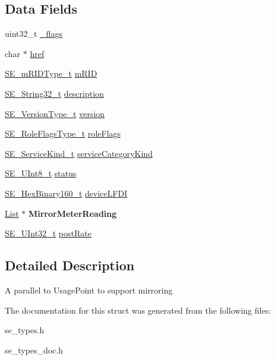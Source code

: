 \subsection*{Data Fields}
\begin{DoxyCompactItemize}
\item 
uint32\+\_\+t \hyperlink{group__MirrorUsagePoint_gae7ccaba110d336f5865327821a929458}{\+\_\+flags}
\item 
char $\ast$ \hyperlink{group__MirrorUsagePoint_ga7e3949f465787de6dcb910e837c1e277}{href}
\item 
\hyperlink{group__mRIDType_gac74622112f3a388a2851b2289963ba5e}{S\+E\+\_\+m\+R\+I\+D\+Type\+\_\+t} \hyperlink{group__MirrorUsagePoint_gacc4f91c3038a5cb63ddf1e7c6ee9f88c}{m\+R\+ID}
\item 
\hyperlink{group__String32_gac9f59b06b168b4d2e0d45ed41699af42}{S\+E\+\_\+\+String32\+\_\+t} \hyperlink{group__MirrorUsagePoint_ga28da144f8ced80b96a6de4426ceded85}{description}
\item 
\hyperlink{group__VersionType_ga4b8d27838226948397ed99f67d46e2ae}{S\+E\+\_\+\+Version\+Type\+\_\+t} \hyperlink{group__MirrorUsagePoint_ga5b263a4254e4f7b510a2dd5fe22e598c}{version}
\item 
\hyperlink{group__RoleFlagsType_gac20b70bba5dd7d6773b13d69c372c957}{S\+E\+\_\+\+Role\+Flags\+Type\+\_\+t} \hyperlink{group__MirrorUsagePoint_ga467c197b2446145027bcbe19c9a9ffea}{role\+Flags}
\item 
\hyperlink{group__ServiceKind_ga19a788255c7eeda579474fc6f3cc0810}{S\+E\+\_\+\+Service\+Kind\+\_\+t} \hyperlink{group__MirrorUsagePoint_gaf3b5785d54afaf564eab607a2b902671}{service\+Category\+Kind}
\item 
\hyperlink{group__UInt8_gaf7c365a1acfe204e3a67c16ed44572f5}{S\+E\+\_\+\+U\+Int8\+\_\+t} \hyperlink{group__MirrorUsagePoint_ga4c5a5200060df3be9b92c9d496b0b526}{status}
\item 
\hyperlink{group__HexBinary160_ga92b92aa55555bdb75f3a59060f2c1632}{S\+E\+\_\+\+Hex\+Binary160\+\_\+t} \hyperlink{group__MirrorUsagePoint_gac9a4ce8c876e783cfdf0bf905b7ec5fc}{device\+L\+F\+DI}
\item 
\hyperlink{structList}{List} $\ast$ {\bfseries Mirror\+Meter\+Reading}
\item 
\hyperlink{group__UInt32_ga70bd4ecda3c0c85d20779d685a270cdb}{S\+E\+\_\+\+U\+Int32\+\_\+t} \hyperlink{group__MirrorUsagePoint_gaddaeaee61ed734dc07e57b9b0614d6f5}{post\+Rate}
\end{DoxyCompactItemize}


\subsection{Detailed Description}
A parallel to Usage\+Point to support mirroring 

The documentation for this struct was generated from the following files\+:\begin{DoxyCompactItemize}
\item 
se\+\_\+types.\+h\item 
se\+\_\+types\+\_\+doc.\+h\end{DoxyCompactItemize}
